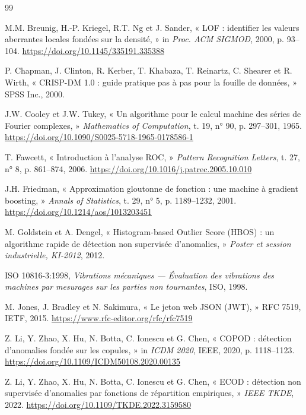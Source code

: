 \documentclass[12pt,a4paper]{report}
\begin{document}
\begin{thebibliography}{99}

 M.M. Breunig, H.-P. Kriegel, R.T. Ng et J. Sander, « LOF : identifier les valeurs aberrantes locales fondées sur la densité, » in \textit{Proc. ACM SIGMOD}, 2000, p. 93--104. \url{https://doi.org/10.1145/335191.335388}

 P. Chapman, J. Clinton, R. Kerber, T. Khabaza, T. Reinartz, C. Shearer et R. Wirth, « CRISP-DM 1.0 : guide pratique pas à pas pour la fouille de données, » SPSS Inc., 2000.

 J.W. Cooley et J.W. Tukey, « Un algorithme pour le calcul machine des séries de Fourier complexes, » \textit{Mathematics of Computation}, t. 19, n° 90, p. 297--301, 1965. \url{https://doi.org/10.1090/S0025-5718-1965-0178586-1}

 T. Fawcett, « Introduction à l'analyse ROC, » \textit{Pattern Recognition Letters}, t. 27, n° 8, p. 861--874, 2006. \url{https://doi.org/10.1016/j.patrec.2005.10.010}

 J.H. Friedman, « Approximation gloutonne de fonction : une machine à gradient boosting, » \textit{Annals of Statistics}, t. 29, n° 5, p. 1189--1232, 2001. \url{https://doi.org/10.1214/aos/1013203451}

 M. Goldstein et A. Dengel, « Histogram-based Outlier Score (HBOS) : un algorithme rapide de détection non supervisée d'anomalies, » \textit{Poster et session industrielle, KI-2012}, 2012.

 ISO 10816-3:1998, \textit{Vibrations mécaniques — Évaluation des vibrations des machines par mesurages sur les parties non tournantes}, ISO, 1998.

 M. Jones, J. Bradley et N. Sakimura, « Le jeton web JSON (JWT), » RFC 7519, IETF, 2015. \url{https://www.rfc-editor.org/rfc/rfc7519}

 Z. Li, Y. Zhao, X. Hu, N. Botta, C. Ionescu et G. Chen, « COPOD : détection d'anomalies fondée sur les copules, » in \textit{ICDM 2020}, IEEE, 2020, p. 1118--1123. \url{https://doi.org/10.1109/ICDM50108.2020.00135}

 Z. Li, Y. Zhao, X. Hu, N. Botta, C. Ionescu et G. Chen, « ECOD : détection non supervisée d'anomalies par fonctions de répartition empiriques, » \textit{IEEE TKDE}, 2022. \url{https://doi.org/10.1109/TKDE.2022.3159580}


\end{thebibliography}
\end{document}
